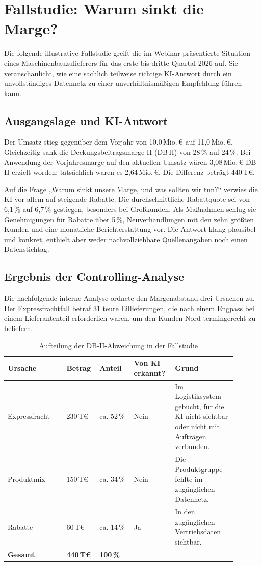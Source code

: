\documentclass[a4paper,12pt,twoside]{report}
\theoremstyle{definition}
\begin{document}
\chapter{Fallstudie: Warum sinkt die Marge?}
\label{sec:case-study}

Die folgende illustrative Fallstudie greift die im Webinar präsentierte Situation eines Maschinenbauzulieferers für das erste bis dritte Quartal 2026 auf. Sie veranschaulicht, wie eine sachlich teilweise richtige KI-Antwort durch ein unvollständiges Datennetz zu einer unverhältnismäßigen Empfehlung führen kann.

\section{Ausgangslage und KI-Antwort}
Der Umsatz stieg gegenüber dem Vorjahr von 10{,}0\,Mio.\,€ auf 11{,}0\,Mio.\,€. Gleichzeitig sank die Deckungsbeitragsmarge II (DB\,II) von 28\,\% auf 24\,\%. Bei Anwendung der Vorjahresmarge auf den aktuellen Umsatz wären 3{,}08\,Mio.\,€ DB\,II erzielt worden; tatsächlich waren es 2{,}64\,Mio.\,€. Die Differenz beträgt 440\,T€.

Auf die Frage „Warum sinkt unsere Marge, und was sollten wir tun?“ verwies die KI vor allem auf steigende Rabatte. Die durchschnittliche Rabattquote sei von 6{,}1\,\% auf 6{,}7\,\% gestiegen, besonders bei Großkunden. Als Maßnahmen schlug sie Genehmigungen für Rabatte über 5\,\%, Neuverhandlungen mit den zehn größten Kunden und eine monatliche Berichterstattung vor. Die Antwort klang plausibel und konkret, enthielt aber weder nachvollziehbare Quellenangaben noch einen Datenstichtag.

\section{Ergebnis der Controlling-Analyse}
Die nachfolgende interne Analyse ordnete den Margenabstand drei Ursachen zu. Der Expressfrachtfall betraf 31 teure Eillieferungen, die nach einem Engpass bei einem Lieferantenteil erforderlich waren, um den Kunden Nord termingerecht zu beliefern.

\begin{table}[htbp]
\centering
\small
\caption{Aufteilung der DB-II-Abweichung in der Fallstudie}
\label{tab:margin-case}
\begin{tabular}{p{0.24\linewidth}p{0.10\linewidth}p{0.14\linewidth}p{0.16\linewidth}p{0.25\linewidth}}
\toprule
\textbf{Ursache} & \textbf{Betrag} & \textbf{Anteil} & \textbf{Von KI erkannt?} & \textbf{Grund} \\
\midrule
Expressfracht & 230\,T€ & ca. 52\,\% & Nein & Im Logistiksystem gebucht, für die KI nicht sichtbar oder nicht mit Aufträgen verbunden. \\
Produktmix & 150\,T€ & ca. 34\,\% & Nein & Die Produktgruppe fehlte im zugänglichen Datennetz. \\
Rabatte & 60\,T€ & ca. 14\,\% & Ja & In den zugänglichen Vertriebsdaten sichtbar. \\
\midrule
\textbf{Gesamt} & \textbf{440\,T€} & \textbf{100\,\%} & & \\
\bottomrule
\end{tabular}
\end{table}
\end{document}
